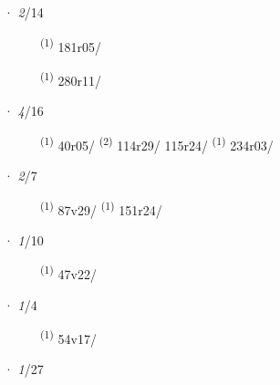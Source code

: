 \noindent{} · \textit{2}/14 \LEMMALINE
\begin{description}
    \item[]  \textsuperscript{(1)} \mbox{181r05/}
    \item[]  \textsuperscript{(1)} \mbox{280r11/}
\end{description}
\ENTRYEND
\noindent{} · \textit{4}/16 \LEMMALINE
\begin{description}
    \item[]  \textsuperscript{(1)} \mbox{40r05/} \textsuperscript{(2)} \mbox{114r29/} \mbox{115r24/} \CASEBREAK {} \textsuperscript{(1)} \mbox{234r03/}
\end{description}
\ENTRYEND
\noindent{} · \textit{2}/7 \LEMMALINE
\begin{description}
    \item[]  \textsuperscript{(1)} \mbox{87v29/} \CASEBREAK {} \textsuperscript{(1)} \mbox{151r24/}
\end{description}
\ENTRYEND
\noindent{} · \textit{1}/10 \LEMMALINE
\begin{description}
    \item[]  \textsuperscript{(1)} \mbox{47v22/}
\end{description}
\ENTRYEND
\noindent{} · \textit{1}/4 \LEMMALINE
\begin{description}
    \item[]  \textsuperscript{(1)} \mbox{54v17/}
\end{description}
\ENTRYEND
\noindent{} · \textit{1}/27 \LEMMALINE
